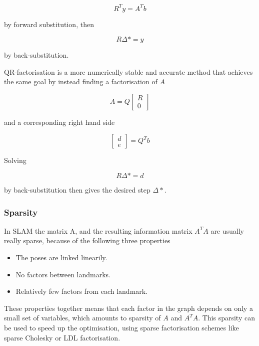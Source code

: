 \begin{equation}
    R^Ty = A^Tb
\end{equation}

by forward substitution, then 

\begin{equation}
    R\Delta* = y
\end{equation}

by back-substitution. 

QR-factorisation is a more numerically stable and accurate method that achieves the same goal by instead finding a factorisation of $A$ 

\begin{equation}
    A = Q\begin{bmatrix} R \\ 0 \end{bmatrix}
\end{equation}

and a corresponding right hand side

\begin{equation}
    \begin{bmatrix} d \\ e \end{bmatrix} = Q^Tb
\end{equation}

Solving 

\begin{equation}
    R\Delta* = d
\end{equation}

by back-substitution then gives the desired step $\Delta*$.

\subsubsection{Sparsity}

In SLAM the matrix A, and the resulting information matrix $A^TA$ are usually really sparse, because of the following three properties

\begin{itemize}
    \item The poses are linked linearily.
    \item No factors between landmarks.
    \item Relatively few factors from each landmark.
\end{itemize}

These properties together means that each factor in the graph depends on only a small set of variables, which amounts to sparsity of $A$ and $A^TA$. This sparsity can be used to speed up the optimisation, using sparse factorisation schemes like sparse Cholesky or LDL factorisation\cite{SparseLinearAlgebra}. 

